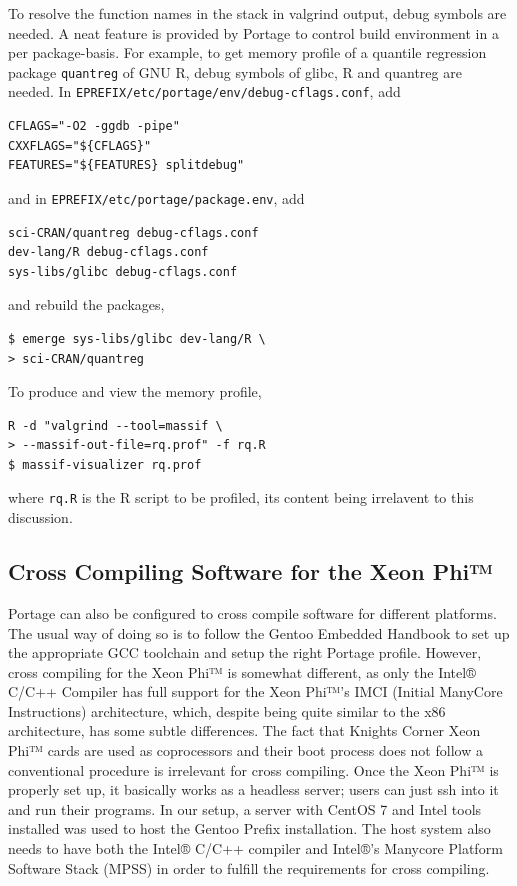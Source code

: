 \documentclass[a4paper,conference]{IEEEtran}
\begin{document}
To resolve the function names in the stack in valgrind output, debug
symbols are needed. A neat feature is provided by Portage to control
build environment in a per package-basis. For example, to get memory
profile of a quantile regression package \texttt{quantreg} of GNU R,
debug symbols of glibc, R and quantreg are needed. In
\texttt{EPREFIX/etc/portage/env/debug-cflags.conf}, add
\begin{verbatim}
CFLAGS="-O2 -ggdb -pipe"
CXXFLAGS="${CFLAGS}"
FEATURES="${FEATURES} splitdebug"
\end{verbatim}
and in \texttt{EPREFIX/etc/portage/package.env}, add
\begin{verbatim}
sci-CRAN/quantreg debug-cflags.conf
dev-lang/R debug-cflags.conf
sys-libs/glibc debug-cflags.conf
\end{verbatim}
and rebuild the packages,
\begin{verbatim}
$ emerge sys-libs/glibc dev-lang/R \
> sci-CRAN/quantreg
\end{verbatim}

To produce and view the memory profile,
\begin{verbatim}
R -d "valgrind --tool=massif \
> --massif-out-file=rq.prof" -f rq.R
$ massif-visualizer rq.prof
\end{verbatim}
where \texttt{rq.R} is the R script to be profiled, its content being
irrelavent to this discussion.

\subsection{Cross Compiling Software for the Xeon Phi™}

Portage can also be configured to cross compile software for different
platforms. The usual way of doing so is to follow the Gentoo Embedded
Handbook \cite{gentoo:embedded} to set up the appropriate GCC toolchain
and setup the right Portage profile. However, cross compiling for the
Xeon Phi™ is somewhat different, as only the Intel® C/C++ Compiler has
full support for the Xeon Phi™'s IMCI (Initial ManyCore Instructions)
architecture, which, despite being quite similar to the x86
architecture, has some subtle differences. The fact that Knights Corner
Xeon Phi™ cards are used as coprocessors and their boot process does not
follow a conventional procedure is irrelevant for cross compiling. Once
the Xeon Phi™ is properly set up, it basically works as a headless
server; users can just ssh into it and run their programs. In our setup,
a server with CentOS 7 and Intel tools installed was used to host the
Gentoo Prefix installation. The host system also needs to have both the
Intel® C/C++ compiler and Intel®'s Manycore Platform Software Stack
(MPSS) in order to fulfill the requirements for cross compiling.
\end{document}
